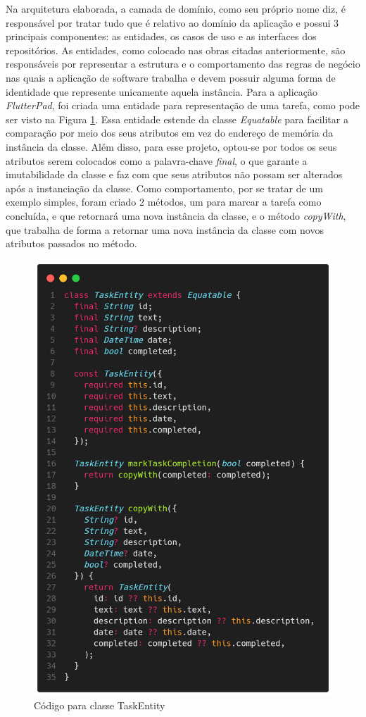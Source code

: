 \documentclass[12pt, %
openright, 
oneside, %
a4paper,    %
brazil]{facom-ufu-abntex2}
\begin{document}
Na arquitetura elaborada, a camada de domínio, como seu próprio nome diz, é responsável por tratar tudo que é relativo ao domínio da aplicação e possui 3 principais componentes: as entidades, os casos de uso e as interfaces dos repositórios. As entidades, como colocado nas obras citadas anteriormente, são responsáveis por representar a estrutura e o comportamento das regras de negócio nas quais a aplicação de software trabalha e devem possuir alguma forma de identidade que represente unicamente aquela instância. Para a aplicação \textit{FlutterPad}, foi criada uma entidade para representação de uma tarefa, como pode ser visto na Figura \ref{fig:task_entity}. Essa entidade estende da classe \textit{Equatable} para facilitar a comparação por meio dos seus atributos em vez do endereço de memória da instância da classe. Além disso, para esse projeto, optou-se por todos os seus atributos serem colocados como a palavra-chave \textit{final}, o que garante a imutabilidade da classe e faz com que seus atributos não possam ser alterados após a instanciação da classe. Como comportamento, por se tratar de um exemplo simples, foram criado 2 métodos, um para marcar a tarefa como concluída, e que retornará uma nova instância da classe, e o método \textit{copyWith}, que trabalha de forma a retornar uma nova instância da classe com novos atributos passados no método.

\begin{figure}[ht]
    \centering
    \includegraphics[width=.50\textwidth, trim={0 30 0 100}, clip]{figures/arch/task_entity.png}
    \caption{Código para classe TaskEntity}
    \label{fig:task_entity}
\end{figure}
\end{document}
